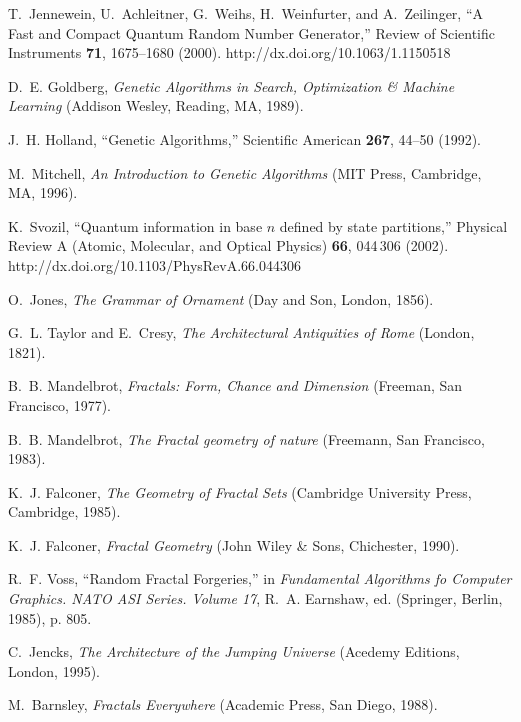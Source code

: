 \documentclass[rmp,amssymb,showpacs,showkeys,12pt,preprint]{revtex4}
\begin{document}
\begin{thebibliography}{10}
T.~Jennewein, U.~Achleitner, G.~Weihs, H.~Weinfurter, and A.~Zeilinger,
  \enquote{A Fast and Compact Quantum Random Number Generator,} Review of
  Scientific Instruments {\bf 71}, 1675--1680 (2000).
\newline http://dx.doi.org/10.1063/1.1150518

D.~E. Goldberg, {\em Genetic Algorithms in Search, Optimization \& Machine
  Learning\/} (Addison Wesley, Reading, MA, 1989).

J.~H. Holland, \enquote{Genetic Algorithms,} Scientific American {\bf 267},
  44--50 (1992).

M.~Mitchell, {\em An Introduction to Genetic Algorithms\/} (MIT Press,
  Cambridge, MA, 1996).

K.~Svozil, \enquote{Quantum information in base $n$ defined by state
  partitions,} Physical Review A (Atomic, Molecular, and Optical Physics) {\bf
  66}, 044\,306 (2002).
\newline http://dx.doi.org/10.1103/PhysRevA.66.044306

O.~Jones, {\em The Grammar of Ornament\/} (Day and Son, London, 1856).

G.~L. Taylor and E.~Cresy, {\em The Architectural Antiquities of Rome\/}
  (London, 1821).

B.~B. Mandelbrot, {\em Fractals: Form, Chance and Dimension\/} (Freeman, San
  Francisco, 1977).

B.~B. Mandelbrot, {\em The Fractal geometry of nature\/} (Freemann, San
  Francisco, 1983).

K.~J. Falconer, {\em The Geometry of Fractal Sets\/} (Cambridge University
  Press, Cambridge, 1985).

K.~J. Falconer, {\em Fractal Geometry\/} (John Wiley \& Sons, Chichester,
  1990).

R.~F. Voss, \enquote{Random Fractal Forgeries,} in {\em Fundamental Algorithms
  fo Computer Graphics. NATO ASI Series. Volume 17\/}, R.~A. Earnshaw, ed.
  (Springer, Berlin, 1985), p. 805.

C.~Jencks, {\em The Architecture of the Jumping Universe\/} (Acedemy Editions,
  London, 1995).

M.~Barnsley, {\em Fractals Everywhere\/} (Academic Press, San Diego, 1988).


\end{thebibliography}
\end{document}
